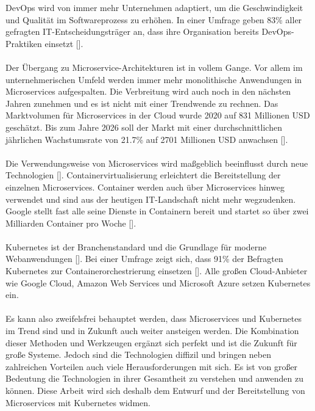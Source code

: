DevOps wird von immer mehr Unternehmen adaptiert, um die Geschwindigkeit und Qualität im Softwareprozess zu erhöhen. In einer Umfrage geben 83\% aller gefragten IT-Entscheidungsträger an, dass ihre Organisation bereits DevOps-Praktiken einsetzt [\cite[S. 10]{puppetState2021}]. \\
\\
Der Übergang zu Microservice-Architekturen ist in vollem Gange. Vor allem im unternehmerischen Umfeld werden immer mehr monolithische Anwendungen in Microservices aufgespalten. Die Verbreitung wird auch noch in den nächsten Jahren zunehmen und es ist nicht mit einer Trendwende zu rechnen. Das Marktvolumen für Microservices in der Cloud wurde 2020 auf 831 Millionen \ac{USD} geschätzt. Bis zum Jahre 2026 soll der Markt mit einer durchschnittlichen jährlichen Wachstumsrate von 21.7\%  auf 2701 Millionen \ac{USD} anwachsen [\cite[S. 7]{mordorintelligenceGlobal2020}]. \\
\\
Die Verwendungsweise von Microservices wird maßgeblich beeinflusst durch neue Technologien [\cite[S. 16]{newmanMicroservices2015}]. Containervirtualisierung erleichtert die Bereitstellung der einzelnen Microservices. Container werden auch über Microservices hinweg verwendet und sind aus der heutigen IT-Landschaft nicht mehr wegzudenken. Google stellt fast alle seine Dienste in Containern bereit und startet so über zwei Milliarden Container pro Woche [\cite[S. 43]{liebelSkalierbare2021}]. \\
\\
Kubernetes ist der Branchenstandard und die Grundlage für moderne Webanwendungen [\cite[Vorwort]{arundelCloud2019}]. Bei einer Umfrage zeigt sich, dass 91\% der Befragten Kubernetes zur Containerorchestrierung einsetzen [\cite[S. 8]{cloudnativecomputingfoundationCloud2020}]. Alle großen Cloud-Anbieter wie Google Cloud, Amazon Web Services und Microsoft Azure setzen Kubernetes ein. \\
\\
Es kann also zweifelsfrei behauptet werden, dass Microservices und Kubernetes im Trend sind und in Zukunft auch weiter ansteigen werden. Die Kombination dieser Methoden und Werkzeugen ergänzt sich perfekt und ist die Zukunft für große Systeme. Jedoch sind die Technologien diffizil und bringen neben zahlreichen Vorteilen auch viele Herausforderungen mit sich. Es ist von großer Bedeutung die Technologien in ihrer Gesamtheit zu verstehen und anwenden zu können. Diese Arbeit wird sich deshalb dem Entwurf und der Bereitstellung von Microservices mit Kubernetes widmen.

